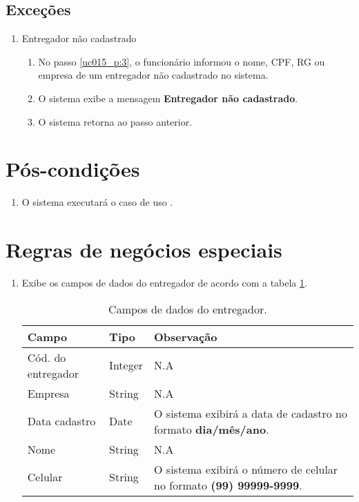 \subsection{Exceções}

\begin{enumerate}[label=E\arabic*]
	\item Entregador não cadastrado \label{uc015_e:1}
	\begin{enumerate}[label*=.\arabic*]
		\item[] No passo \ref{uc015_p:3}, o funcionário informou o nome, CPF, RG ou empresa de um entregador não cadastrado no sistema.
		\item O sistema exibe a mensagem \textbf{Entregador não cadastrado}.
		\item O sistema retorna ao passo anterior.
	\end{enumerate}
\end{enumerate}

\section{Pós-condições}

\begin{enumerate}
	\item O sistema executará o caso de uso .	
\end{enumerate}

\section{Regras de negócios especiais}

\begin{enumerate}[label=RN\arabic*]
	\item Exibe os campos de dados do entregador de acordo com a tabela \ref{uc015_tb_rn1}. \label{uc015_rn:1}
	\begin{table}[htb]
		\ABNTEXfontereduzida
		\caption[Campos de dados do entregador]{Campos de dados do entregador.}
		\label{uc015_tb_rn1}
		\begin{tabular}{|p{4.0cm}|p{3.0cm}|p{7.25cm}|}
			\hline
			\textbf{Campo}     & \textbf{Tipo} & \textbf{Observação}                                                        \\ \hline
			Cód. do entregador & Integer       & N.A                                                                        \\ \hline
			Empresa            & String        & N.A                                                                        \\ \hline
			Data cadastro      & Date          & O sistema exibirá a data de cadastro no formato \textbf{dia/mês/ano}.      \\ \hline
			Nome               & String        & N.A                                                                        \\ \hline
			Celular            & String        & O sistema exibirá o número de celular no formato \textbf{(99) 99999-9999}. \\ \hline
		\end{tabular}
	\end{table}
\end{enumerate}